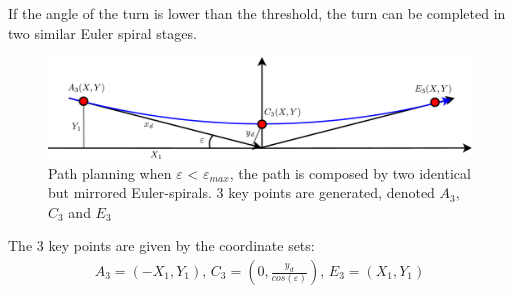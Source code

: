 If the angle of the turn is lower than the threshold, the turn can be completed in two similar Euler spiral stages.
\begin{figure}
	\begin{center}
		\includegraphics[width=\textwidth]{img/LocalPlannerFigures/3Points.pdf}
		\caption{Path planning when $\varepsilon$ < $\varepsilon_{max}$, the path is composed by two identical but mirrored Euler-spirals. 3 key points are generated, denoted $A_3$, $C_3$ and $E_3$}
		\label{fig:3points}
	\end{center}
\end{figure}

The 3 key points are given by the coordinate sets:
\begin{align}
A_3 = (-X_1,Y_1),\, C_3 = (0,\frac{y_d}{cos(\varepsilon)}),\, E_3 = (X_1,Y_1)
\end{align}

